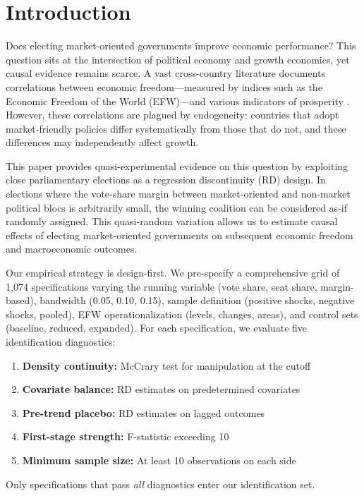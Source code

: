 \documentclass[12pt,a4paper]{article}
\begin{document}
\thispagestyle{empty}
\newpage
\setcounter{page}{1}


\tableofcontents
\newpage


\section{Introduction}
\label{sec:introduction}

Does electing market-oriented governments improve economic performance? This 
question sits at the intersection of political economy and growth economics, 
yet causal evidence remains scarce. A vast cross-country literature documents 
correlations between economic freedom---measured by indices such as the 
Economic Freedom of the World (EFW)---and various indicators of prosperity 
\citep{gwartney2004economic, hall1999why, murphy2019economic}. However, 
these correlations are plagued by endogeneity: countries that adopt 
market-friendly policies differ systematically from those that do not, and 
these differences may independently affect growth.

This paper provides quasi-experimental evidence on this question by exploiting 
close parliamentary elections as a regression discontinuity (RD) design. In 
elections where the vote-share margin between market-oriented and non-market 
political blocs is arbitrarily small, the winning coalition can be considered 
as-if randomly assigned. This quasi-random variation allows us to estimate 
causal effects of electing market-oriented governments on subsequent economic 
freedom and macroeconomic outcomes.

Our empirical strategy is design-first. We pre-specify a comprehensive grid 
of 1,074 specifications varying the running variable (vote share, seat share, 
margin-based), bandwidth (0.05, 0.10, 0.15), sample definition (positive shocks, 
negative shocks, pooled), EFW operationalization (levels, changes, areas), and 
control sets (baseline, reduced, expanded). For each specification, we evaluate 
five identification diagnostics:
%
\begin{enumerate}[noitemsep]
    \item \textbf{Density continuity:} McCrary test for manipulation at the cutoff
    \item \textbf{Covariate balance:} RD estimates on predetermined covariates
    \item \textbf{Pre-trend placebo:} RD estimates on lagged outcomes
    \item \textbf{First-stage strength:} F-statistic exceeding 10
    \item \textbf{Minimum sample size:} At least 10 observations on each side
\end{enumerate}
%
Only specifications that pass \textit{all} diagnostics enter our identification set.
\end{document}

